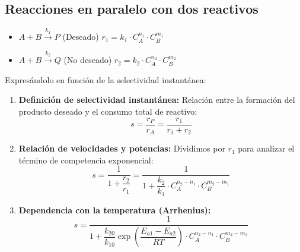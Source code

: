 \subsection{Reacciones en paralelo con dos reactivos}

\begin{itemize}
  \item $A + B \xrightarrow{k_1} P$ (Deseado) \hspace{5mm} $r_1 = k_1 \cdot C_A^{n_1} \cdot C_B^{m_1}$
  \item $A + B \xrightarrow{k_2} Q$ (No deseado) \hspace{5mm} $r_2 = k_2 \cdot C_A^{n_2} \cdot C_B^{m_2}$
\end{itemize}

\noindent Expresándolo en función de la selectividad instantánea:

\begin{enumerate}
  \item \textbf{Definición de selectividad instantánea:}
        Relación entre la formación del producto deseado y el consumo total de reactivo:
        \begin{equation}
          s = \frac{r_P}{r_A} = \frac{r_1}{r_1 + r_2}
        \end{equation}

  \item \textbf{Relación de velocidades y potencias:}
        Dividimos por $r_1$ para analizar el término de competencia exponencial:
        \begin{equation}
          s = \frac{1}{1 + \dfrac{r_2}{r_1}} = \frac{1}{1 + \dfrac{k_2}{k_1} \cdot C_A^{n_2-n_1} \cdot C_B^{m_2-m_1}}
        \end{equation}

  \item \textbf{Dependencia con la temperatura (Arrhenius):}
        \begin{equation}
          s = \frac{1}{1 + \dfrac{k_{20}}{k_{10}} \exp \left( \dfrac{E_{a1} - E_{a2}}{RT} \right) \cdot C_A^{n_2 - n_1} \cdot C_B^{m_2 - m_1}}
        \end{equation}
\end{enumerate}


